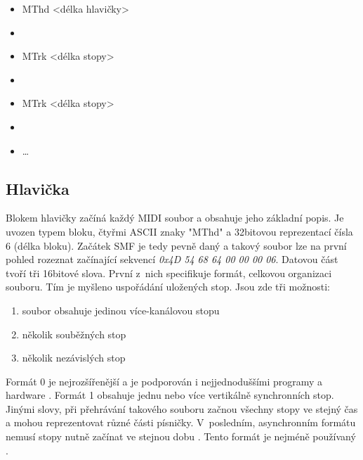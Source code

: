 \begin{itemize} [label={}]
    \item MThd <délka hlavičky>
    \item <data hlavičky>
    \item MTrk <délka stopy>
    \item <data stopy>
    \item MTrk <délka stopy>
    \item <data stopy>
    \item \dots
\end{itemize}

\subsection{Hlavička}
Blokem hlavičky začíná každý MIDI soubor a obsahuje jeho základní popis.
Je uvozen typem bloku, čtyřmi ASCII znaky "MThd" 
a 32bitovou reprezentací čísla 6 (délka bloku). 
Začátek SMF je tedy pevně daný a takový soubor lze na první pohled rozeznat začínající sekvencí 
\emph{0x4D 54 68 64 00 00 00 06}. 
Datovou část tvoří tři 16bitové slova.
První z~nich specifikuje formát, celkovou organizaci souboru.
Tím je myšleno uspořádání uložených stop.
Jsou zde tři možnosti:

\begin{enumerate}\addtocounter{enumi}{-1}
    \item soubor obsahuje jedinou více-kanálovou stopu
    \item několik souběžných stop
    \item několik nezávislých stop
\end{enumerate}

Formát 0 je nejrozšířenější a je podporován i nejjednoduššími programy 
a hardware
\cite{Back_SMF_Specif}.
Formát 1 obsahuje jednu nebo více vertikálně synchronních stop.
Jinými slovy, při přehrávání takového souboru 
začnou všechny stopy ve stejný čas 
a mohou reprezentovat různé části písničky.
V~posledním, asynchronním formátu nemusí stopy nutně začínat ve stejnou dobu
\cite{Glatt_aboutMIDIFiles}.
Tento formát je nejméně používaný
\cite{MIDI_tutorials}.
\par

